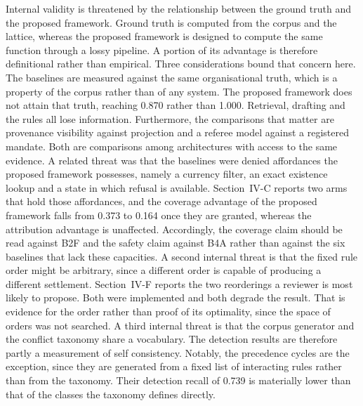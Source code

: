 \documentclass[journal]{IEEEtran}
\begin{document}
Internal validity is threatened by the relationship between the ground truth and the proposed framework. Ground truth is computed from the corpus and the lattice, whereas the proposed framework is designed to compute the same function through a lossy pipeline. A portion of its advantage is therefore definitional rather than empirical. Three considerations bound that concern here. The baselines are measured against the same organisational truth, which is a property of the corpus rather than of any system. The proposed framework does not attain that truth, reaching 0.870 rather than 1.000. Retrieval, drafting and the rules all lose information. Furthermore, the comparisons that matter are provenance visibility against projection and a referee model against a registered mandate. Both are comparisons among architectures with access to the same evidence. A related threat was that the baselines were denied affordances the proposed framework possesses, namely a currency filter, an exact existence lookup and a state in which refusal is available. Section~IV-C reports two arms that hold those affordances, and the coverage advantage of the proposed framework falls from 0.373 to 0.164 once they are granted, whereas the attribution advantage is unaffected. Accordingly, the coverage claim should be read against B2F and the safety claim against B4A rather than against the six baselines that lack these capacities. A second internal threat is that the fixed rule order might be arbitrary, since a different order is capable of producing a different settlement. Section~IV-F reports the two reorderings a reviewer is most likely to propose. Both were implemented and both degrade the result. That is evidence for the order rather than proof of its optimality, since the space of orders was not searched. A third internal threat is that the corpus generator and the conflict taxonomy share a vocabulary. The detection results are therefore partly a measurement of self consistency. Notably, the precedence cycles are the exception, since they are generated from a fixed list of interacting rules rather than from the taxonomy. Their detection recall of 0.739 is materially lower than that of the classes the taxonomy defines directly.
\end{document}
